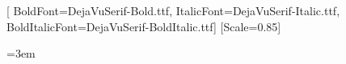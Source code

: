 \usepackage{fontspec}
\setmainfont{DejaVuSerif.ttf}[
  BoldFont=DejaVuSerif-Bold.ttf,
  ItalicFont=DejaVuSerif-Italic.ttf,
  BoldItalicFont=DejaVuSerif-BoldItalic.ttf]
\setmonofont{DejaVuSansMono.ttf}[Scale=0.85]
\newfontfamily{}
\usepackage{ucharclasses}
\setTransitionsForCJK{\cjkfont}{\normalfont}
\usepackage{newunicodechar}
\usepackage{seqsplit}
\let\oldtexttt\texttt
\renewcommand{\texttt}[1]{\oldtexttt{\seqsplit{#1}}}
\emergencystretch=3em

